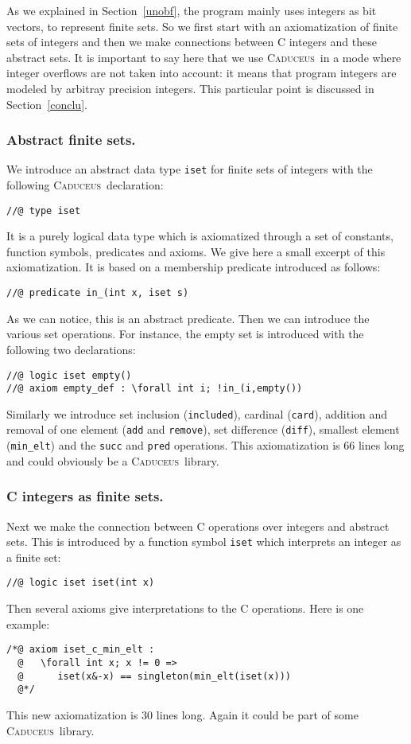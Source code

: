 \documentclass[a4paper]{llncs}
\newcommand{\caduceus}{\textsc{Caduceus}}
\begin{document}
As we explained in Section~\ref{unobf}, the program mainly uses integers
as bit vectors, to represent finite sets.  So we first start with an
axiomatization of finite sets of integers and then we make connections
between C integers and these abstract sets. It is important to say
here that we use \caduceus\ in a mode where integer overflows are not
taken into account: it means that program integers are modeled by arbitray
precision integers. This particular point is discussed in
Section~\ref{conclu}. 

\subsubsection{Abstract finite sets.}
We introduce an abstract data type \texttt{iset} for finite sets of
integers with the following \caduceus\ declaration:
\begin{verbatim}
//@ type iset
\end{verbatim}
It is a purely logical data type which is axiomatized through a set of
constants, function symbols, predicates and axioms. We give here a small 
excerpt of this axiomatization. It is based on a
membership predicate  introduced as follows:
\begin{verbatim}
//@ predicate in_(int x, iset s)
\end{verbatim}
As we can notice, this is an abstract predicate. Then we can introduce
the various set operations. For instance, the empty set is introduced
with the following two declarations:
\begin{verbatim}
//@ logic iset empty()
//@ axiom empty_def : \forall int i; !in_(i,empty())
\end{verbatim}
Similarly we introduce set inclusion (\texttt{included}), cardinal
(\texttt{card}), addition and removal
of one element (\texttt{add} and 
\texttt{remove}), set difference (\texttt{diff}), smallest element
(\texttt{min\_elt}) and the \texttt{succ} and \texttt{pred} operations.
This axiomatization is 66 lines long and could obviously be a 
\caduceus\ library.

\subsubsection{C integers as finite sets.}
Next we make the connection between C operations over integers and
abstract sets. This is introduced by a function symbol \texttt{iset}
which interprets an integer as a finite set:
\begin{verbatim}
//@ logic iset iset(int x)
\end{verbatim}
Then several axioms give interpretations to the C operations.
Here is one example:
\begin{verbatim}
/*@ axiom iset_c_min_elt :
  @   \forall int x; x != 0 =>
  @      iset(x&-x) == singleton(min_elt(iset(x)))
  @*/
\end{verbatim}
This new axiomatization is 30 lines long. Again it could be part of some
\caduceus\ library.
\end{document}
